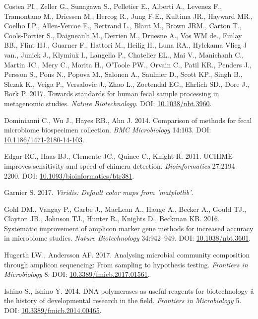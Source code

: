 \documentclass[12pt,]{article}
\begin{document}
\hypertarget{ref-metagenomcis_bias_Costea_2017}{}
Costea PI., Zeller G., Sunagawa S., Pelletier E., Alberti A., Levenez
F., Tramontano M., Driessen M., Hercog R., Jung F-E., Kultima JR.,
Hayward MR., Coelho LP., Allen-Vercoe E., Bertrand L., Blaut M., Brown
JRM., Carton T., Cools-Portier S., Daigneault M., Derrien M., Druesne
A., Vos WM de., Finlay BB., Flint HJ., Guarner F., Hattori M., Heilig
H., Luna RA., Hylckama Vlieg J van., Junick J., Klymiuk I., Langella P.,
Chatelier EL., Mai V., Manichanh C., Martin JC., Mery C., Morita H.,
O'Toole PW., Orvain C., Patil KR., Penders J., Persson S., Pons N.,
Popova M., Salonen A., Saulnier D., Scott KP., Singh B., Slezak K.,
Veiga P., Versalovic J., Zhao L., Zoetendal EG., Ehrlich SD., Dore J.,
Bork P. 2017. Towards standards for human fecal sample processing in
metagenomic studies. \emph{Nature Biotechnology}. DOI:
\href{https://doi.org/10.1038/nbt.3960}{10.1038/nbt.3960}.

\hypertarget{ref-preservation_Dominianni_2014}{}
Dominianni C., Wu J., Hayes RB., Ahn J. 2014. Comparison of methods for
fecal microbiome biospecimen collection. \emph{BMC Microbiology} 14:103.
DOI:
\href{https://doi.org/10.1186/1471-2180-14-103}{10.1186/1471-2180-14-103}.

\hypertarget{ref-uchime_Edgar_2011}{}
Edgar RC., Haas BJ., Clemente JC., Quince C., Knight R. 2011. UCHIME
improves sensitivity and speed of chimera detection.
\emph{Bioinformatics} 27:2194--2200. DOI:
\href{https://doi.org/10.1093/bioinformatics/btr381}{10.1093/bioinformatics/btr381}.

\hypertarget{ref-viridis_citation_2017}{}
Garnier S. 2017. \emph{Viridis: Default color maps from 'matplotlib'}.

\hypertarget{ref-taq_Gohl_2016}{}
Gohl DM., Vangay P., Garbe J., MacLean A., Hauge A., Becker A., Gould
TJ., Clayton JB., Johnson TJ., Hunter R., Knights D., Beckman KB. 2016.
Systematic improvement of amplicon marker gene methods for increased
accuracy in microbiome studies. \emph{Nature Biotechnology} 34:942--949.
DOI: \href{https://doi.org/10.1038/nbt.3601}{10.1038/nbt.3601}.

\hypertarget{ref-review_Hugerth_2017}{}
Hugerth LW., Andersson AF. 2017. Analysing microbial community
composition through amplicon sequencing: From sampling to hypothesis
testing. \emph{Frontiers in Microbiology} 8. DOI:
\href{https://doi.org/10.3389/fmicb.2017.01561}{10.3389/fmicb.2017.01561}.

\hypertarget{ref-polymerase_Ishino_2014}{}
Ishino S., Ishino Y. 2014. DNA polymerases as useful reagents for
biotechnology â the history of developmental research in the field.
\emph{Frontiers in Microbiology} 5. DOI:
\href{https://doi.org/10.3389/fmicb.2014.00465}{10.3389/fmicb.2014.00465}.
\end{document}

